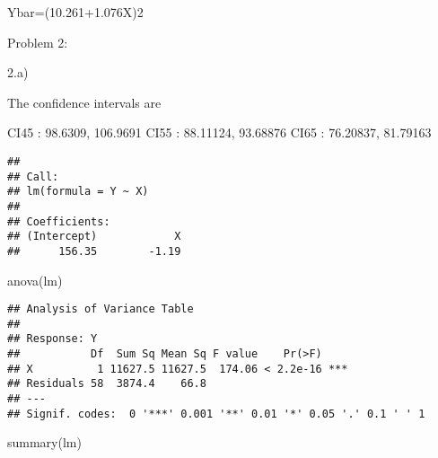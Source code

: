 \documentclass[
]{article}
\newenvironment{Shaded}{\begin{snugshade}}{\end{snugshade}}
\newcommand{\AttributeTok}[1]{\textcolor[rgb]{0.77,0.63,0.00}{#1}}
\newcommand{\ConstantTok}[1]{\textcolor[rgb]{0.00,0.00,0.00}{#1}}
\newcommand{\DecValTok}[1]{\textcolor[rgb]{0.00,0.00,0.81}{#1}}
\newcommand{\FunctionTok}[1]{\textcolor[rgb]{0.00,0.00,0.00}{#1}}
\newcommand{\NormalTok}[1]{#1}
\newcommand{\OtherTok}[1]{\textcolor[rgb]{0.56,0.35,0.01}{#1}}
\newcommand{\SpecialCharTok}[1]{\textcolor[rgb]{0.00,0.00,0.00}{#1}}
\newcommand{\StringTok}[1]{\textcolor[rgb]{0.31,0.60,0.02}{#1}}
\begin{document}
Ybar=(10.261+1.076X)2

Problem 2:

2.a)

The confidence intervals are

CI45 : 98.6309, 106.9691 CI55 : 88.11124, 93.68876 CI65 : 76.20837,
81.79163

\begin{Shaded}
\end{Shaded}

\begin{verbatim}
## 
## Call:
## lm(formula = Y ~ X)
## 
## Coefficients:
## (Intercept)            X  
##      156.35        -1.19
\end{verbatim}

\begin{Shaded}
\begin{Highlighting}[]
\FunctionTok{anova}\NormalTok{(lm)}
\end{Highlighting}
\end{Shaded}

\begin{verbatim}
## Analysis of Variance Table
## 
## Response: Y
##           Df  Sum Sq Mean Sq F value    Pr(>F)    
## X          1 11627.5 11627.5  174.06 < 2.2e-16 ***
## Residuals 58  3874.4    66.8                      
## ---
## Signif. codes:  0 '***' 0.001 '**' 0.01 '*' 0.05 '.' 0.1 ' ' 1
\end{verbatim}

\begin{Shaded}
\begin{Highlighting}[]
\FunctionTok{summary}\NormalTok{(lm)}
\end{Highlighting}
\end{Shaded}
\end{document}
